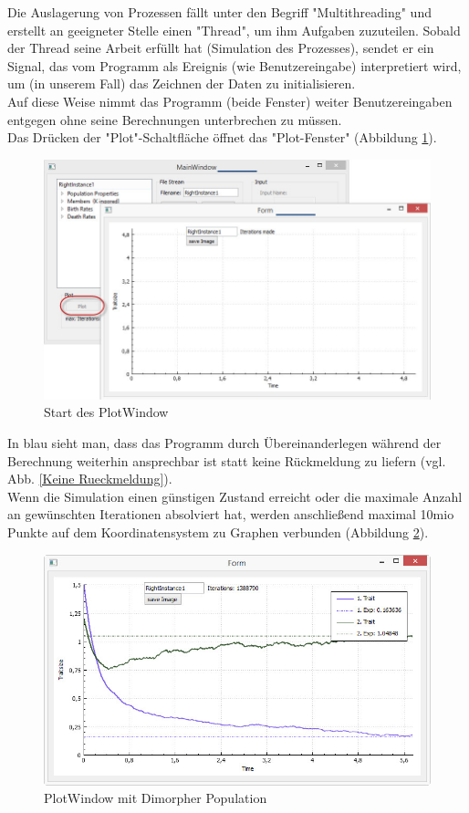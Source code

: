 \documentclass[11pt, a4paper, german]{article}
\theoremstyle{plain}
\begin{document}
	Die Auslagerung von Prozessen fällt unter den Begriff "{}Multithreading"{} und erstellt an geeigneter Stelle einen "{}Thread"{}, um ihm Aufgaben zuzuteilen. Sobald der Thread seine Arbeit erfüllt hat (Simulation des Prozesses), sendet er ein Signal, das vom Programm als Ereignis (wie Benutzereingabe) interpretiert wird, um (in unserem Fall) das Zeichnen der Daten zu initialisieren.\\
	Auf diese Weise nimmt das Programm (beide Fenster) weiter Benutzereingaben entgegen ohne seine Berechnungen unterbrechen zu müssen.\\
	Das Drücken der "{}Plot"{}-Schaltfläche öffnet das "{}Plot-Fenster"{} (Abbildung \ref{PlotWindow_start}).
	\begin{figure}[H]
		\centering
		\includegraphics[width=1\linewidth]{./Pictures/PlotWindow_start}
		\caption[PlotWindow_start]{Start des PlotWindow}
		\label{PlotWindow_start}
	\end{figure}
	In blau sieht man, dass das Programm durch Übereinanderlegen während der Berechnung weiterhin ansprechbar ist statt keine Rückmeldung zu liefern (vgl. Abb. \ref{Keine Rueckmeldung}).\\
	Wenn die Simulation  einen günstigen Zustand erreicht oder die maximale Anzahl an gewünschten Iterationen absolviert hat, werden anschließend maximal 10mio Punkte auf dem Koordinatensystem zu Graphen verbunden (Abbildung \ref{PlotWindow_smallBPDL}). 
	\begin{figure}[H]
		\centering
		\includegraphics[width=0.9\linewidth]{./Pictures/PlotWindow_smallBPDL}
		\caption[PlotWindow]{PlotWindow mit Dimorpher Population}
		\label{PlotWindow_smallBPDL}
	\end{figure}
	
\end{document}
